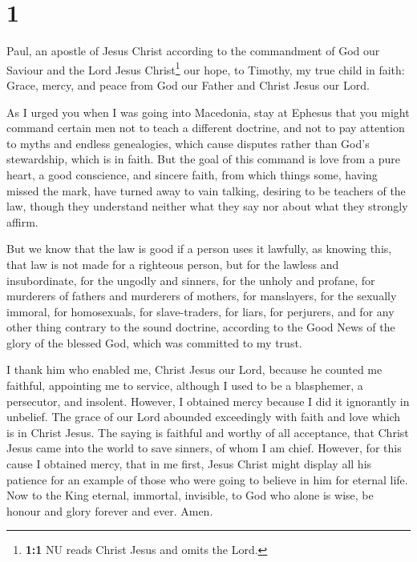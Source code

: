 \hypertarget{section}{%
\section{1}\label{section}}

 Paul, an apostle of Jesus Christ according to the
commandment of God our Saviour and the Lord Jesus Christ\footnote{\textbf{1:1}
  NU reads Christ Jesus and omits the Lord.} our hope,  to
Timothy, my true child in faith: Grace, mercy, and peace from God our
Father and Christ Jesus our Lord.

 As I urged you when I was going into Macedonia, stay at
Ephesus that you might command certain men not to teach a different
doctrine,  and not to pay attention to myths and endless
genealogies, which cause disputes rather than God's stewardship, which
is in faith.  But the goal of this command is love from a
pure heart, a good conscience, and sincere faith,  from
which things some, having missed the mark, have turned away to vain
talking,  desiring to be teachers of the law, though they
understand neither what they say nor about what they strongly affirm.

 But we know that the law is good if a person uses it
lawfully,  as knowing this, that law is not made for a
righteous person, but for the lawless and insubordinate, for the ungodly
and sinners, for the unholy and profane, for murderers of fathers and
murderers of mothers, for manslayers,  for the sexually
immoral, for homosexuals, for slave-traders, for liars, for perjurers,
and for any other thing contrary to the sound doctrine, 
according to the Good News of the glory of the blessed God, which was
committed to my trust.

 I thank him who enabled me, Christ Jesus our Lord,
because he counted me faithful, appointing me to service,
 although I used to be a blasphemer, a persecutor, and
insolent. However, I obtained mercy because I did it ignorantly in
unbelief.  The grace of our Lord abounded exceedingly
with faith and love which is in Christ Jesus.  The saying
is faithful and worthy of all acceptance, that Christ Jesus came into
the world to save sinners, of whom I am chief.  However,
for this cause I obtained mercy, that in me first, Jesus Christ might
display all his patience for an example of those who were going to
believe in him for eternal life.  Now to the King
eternal, immortal, invisible, to God who alone is wise, be honour and
glory forever and ever. Amen.

